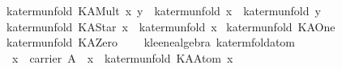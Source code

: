 \begin{isabellebody}
{}\ {}ka{}term{}unfold\ {}KAMult\ x\ y{}\ {}\ {}ka{}term{}unfold\ x{}\ {}\ {}ka{}term{}unfold\ y{}{}\isanewline
{}\ {}ka{}term{}unfold\ {}KAStar\ x{}\ {}\ {}ka{}term{}unfold\ x{}\isanewline
{}\ {}ka{}term{}unfold\ KAOne\ {}\ {}{}\isanewline
{}\ {}ka{}term{}unfold\ KAZero\ {}\ {}{}\isanewline
\isanewline
{}\isamarkupfalse%
\ {}\ kleene{}algebra{}\ ka{}term{}fold{}atom{}\isanewline
\ \ {}x\ {}\ carrier\ A\ {}\ x\ {}\ ka{}term{}unfold\ {}KAAtom\ x{}{}\isanewline

\end{isabellebody}
